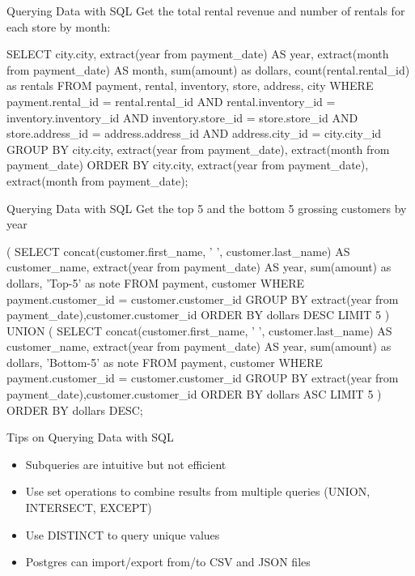 \documentclass[ignorenonframetext,xcolor=x11names]{beamer}
\begin{document}
\begin{frame}[fragile]{Querying Data with SQL}
Get the total rental revenue and number of rentals for each store by month:
\scriptsize
\begin{sqlcode}
SELECT city.city, 
       extract(year from payment_date) AS year, 
       extract(month from payment_date) AS month, 
       sum(amount) as dollars, 
       count(rental.rental_id) as rentals
FROM payment, rental, inventory, store, address, city
WHERE payment.rental_id = rental.rental_id AND
      rental.inventory_id = inventory.inventory_id AND
      inventory.store_id = store.store_id AND
      store.address_id = address.address_id AND
      address.city_id = city.city_id
GROUP BY city.city, 
         extract(year from payment_date), 
         extract(month from payment_date)
ORDER BY city.city, 
         extract(year from payment_date), 
         extract(month from payment_date);
\end{sqlcode}
\end{frame}

\begin{frame}[fragile]{Querying Data with SQL}
Get the top 5 and the bottom 5 grossing customers by year
\scriptsize
\begin{sqlcode}
( SELECT concat(customer.first_name, ' ', 
             customer.last_name) AS customer_name,
       extract(year from payment_date) AS year, 
       sum(amount) as dollars,
       'Top-5' as note
FROM payment, customer
WHERE payment.customer_id = customer.customer_id
GROUP BY extract(year from payment_date),customer.customer_id
ORDER BY dollars DESC LIMIT 5
) UNION (
SELECT concat(customer.first_name, ' ', 
           customer.last_name) AS customer_name,
       extract(year from payment_date) AS year, 
       sum(amount) as dollars,
       'Bottom-5' as note
FROM payment, customer
WHERE payment.customer_id = customer.customer_id
GROUP BY extract(year from payment_date),customer.customer_id
ORDER BY dollars ASC LIMIT 5 ) 
ORDER BY dollars DESC;
\end{sqlcode}
\end{frame}

\begin{frame}{Tips on Querying Data with SQL}
\begin{itemize}
  \item Subqueries are intuitive but not efficient
  \item Use set operations to combine results from multiple queries (UNION, INTERSECT, EXCEPT)
  \item Use DISTINCT to query unique values
  \item Postgres can import/export from/to CSV and JSON files
\end{itemize}
\end{frame}
\end{document}
